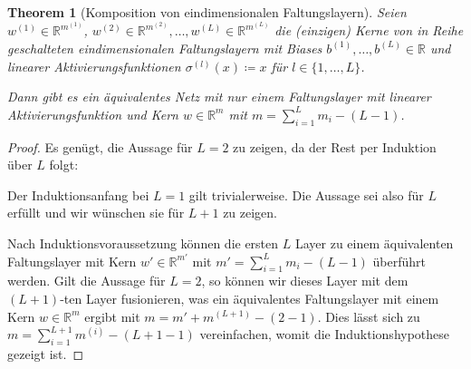 \documentclass[paper=a4, 	%
		fontsize=11pt,
		abstract=true, 	%
		headsepline, 	%
		notitlepage	%
		]{scrartcl}
\newtheorem{theorem}{Theorem}[section]
\theoremstyle{definition}
\newcommand{\R}{\mathbb{R}}
\begin{document}
\begin{theorem}[Komposition von eindimensionalen Faltungslayern]\label{thm:matrix-collapse-linear-conv-layers}
    Seien $w^{(1)}\in\R^{m^{(1)}}$, $w^{(2)}\in\R^{m^{(2)}}, \dots, w^{(L)}\in\R^{m^{(L)}}$ die (einzigen) Kerne von in Reihe geschalteten eindimensionalen Faltungslayern mit Biases $b^{(1)},\dots, b^{(L)}\in\R$ und linearer Aktivierungsfunktionen $\sigma^{(l)}(x) \coloneqq x$ für $l\in\{1,\dots,L\}$.

    Dann gibt es ein äquivalentes Netz mit nur einem Faltungslayer mit linearer Aktivierungsfunktion und Kern $w\in\R^m$ mit $m=\sum_{i=1}^L m_i - (L-1)$.
\end{theorem}
\begin{proof}
    Es genügt, die Aussage für $L=2$ zu zeigen, da der Rest per Induktion über $L$ folgt:

    Der Induktionsanfang bei $L=1$ gilt trivialerweise.
    Die Aussage sei also für $L$ erfüllt und wir wünschen sie für $L+1$ zu zeigen.
        
    Nach Induktionsvoraussetzung können die ersten $L$ Layer zu einem äquivalenten Faltungslayer mit Kern $w'\in \R^{m'}$ mit $m'=\sum_{i=1}^L m_i - (L-1)$ überführt werden.
    Gilt die Aussage für $L=2$, so können wir dieses Layer mit dem $(L+1)$-ten Layer fusionieren, was ein äquivalentes Faltungslayer mit einem Kern $w\in\R^m$ ergibt mit $m = m' + m^{(L+1)} - (2-1)$.
    Dies lässt sich zu $m = \sum_{i=1}^{L+1} m^{(i)} - (L+1 - 1) $ vereinfachen, womit die Induktionshypothese gezeigt ist.
    

\end{proof}
\end{document}
